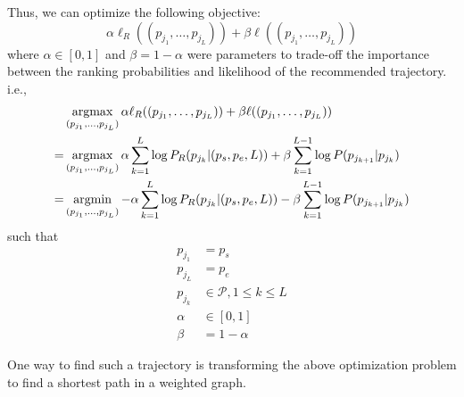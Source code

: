 

Thus, we can optimize the following objective:
\begin{displaymath}
    \alpha \ell_R((p_{j_1}, \dots, p_{j_L})) + \beta \ell((p_{j_1}, \dots, p_{j_L}))
\end{displaymath}
where $\alpha \in [0, 1]$ and $\beta = 1 - \alpha$ were parameters to trade-off the importance between the ranking probabilities 
and likelihood of the recommended trajectory.
i.e.,
\begin{align*}
    & \operatorname*{argmax}_{(p_{j_1}, \dots, p_{j_L})} \alpha \ell_R((p_{j_1}, \dots, p_{j_L})) + \beta \ell((p_{j_1}, \dots, p_{j_L})) \\
   =& \operatorname*{argmax}_{(p_{j_1}, \dots, p_{j_L})} \alpha \sum_{k=1}^L \log P_R(p_{j_k} |(p_s, p_e, L)) + 
      \beta \sum_{k=1}^{L-1} \log P(p_{j_{k+1}} | p_{j_k}) \\
   =& \operatorname*{argmin}_{(p_{j_1}, \dots, p_{j_L})} - \alpha \sum_{k=1}^L \log P_R(p_{j_k} |(p_s, p_e, L)) -
      \beta \sum_{k=1}^{L-1} \log P(p_{j_{k+1}} | p_{j_k}) 
\end{align*}
such that
\begin{align*}
    p_{j_1} &= p_s \\
    p_{j_L} &= p_e \\
    p_{j_k} &\in \mathcal{P}, 1 \le k \le L \\
    \alpha  &\in [0, 1] \\
    \beta   &= 1 - \alpha
\end{align*}

One way to find such a trajectory is transforming the above optimization problem to 
find a shortest path in a weighted graph.

